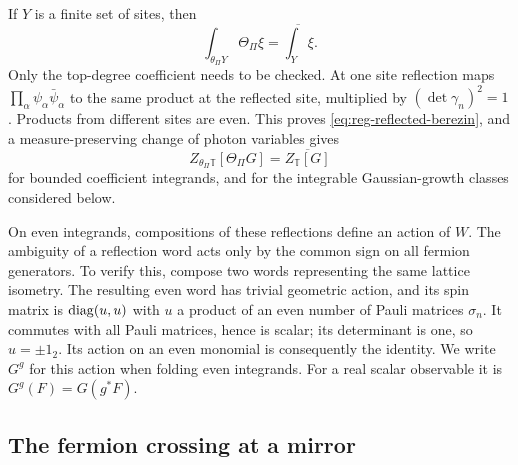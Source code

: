 If $Y$ is a finite set of sites, then
\begin{equation}\label{eq:reg-reflected-berezin}
 \int_{\theta_\Pi Y}\Theta_\Pi\xi=\overline{\int_Y\xi}.
\end{equation}
Only the top-degree coefficient needs to be checked. At one site
reflection maps $\prod_\alpha\psi_\alpha\bar\psi_\alpha$ to the same
product at the reflected site, multiplied by $(\det\gamma_n)^2=1$.
Products from different sites are even. This proves
\eqref{eq:reg-reflected-berezin}, and a measure-preserving change of
photon variables gives
\begin{equation}\label{eq:reg-reflected-functional}
 Z_{\theta_\Pi\mathbb T}[\Theta_\Pi G]
 =\overline{Z_{\mathbb T}[G]}
\end{equation}
for bounded coefficient integrands, and for the integrable
Gaussian-growth classes considered below.

On even integrands, compositions of these reflections define an
action of $W$. The ambiguity of a reflection word acts only by the
common sign on all fermion generators. To verify this, compose two
words representing the same lattice isometry. The resulting even
word has trivial geometric action, and its spin matrix is
$\operatorname{diag}(u,u)$ with $u$ a product of an even number of Pauli matrices
$\sigma_n$. It commutes with all Pauli matrices, hence is scalar;
its determinant is one, so $u=\pm1_2$. Its action on an even monomial
is consequently the identity. We write $G^g$ for this action when
folding even integrands. For a real scalar observable it is
$G^g(F)=G(g^*F)$.

\subsection{The fermion crossing at a mirror}\label{subsec:reg-crossing}

